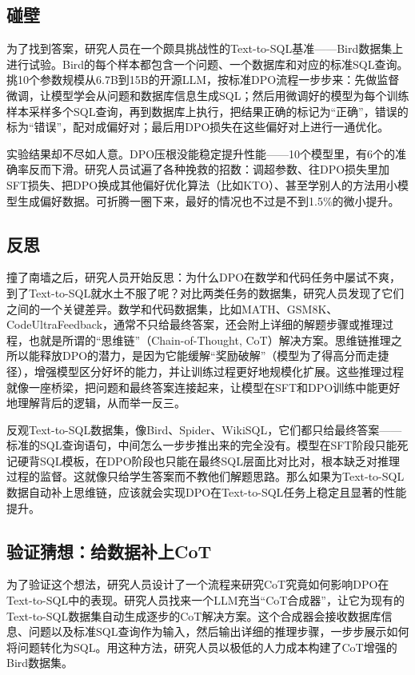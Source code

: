 \subsection{碰壁}

为了找到答案，研究人员在一个颇具挑战性的Text-to-SQL基准——Bird数据集上进行试验。Bird的每个样本都包含一个问题、一个数据库和对应的标准SQL查询。挑10个参数规模从6.7B到15B的开源LLM，按标准DPO流程一步步来：先做监督微调，让模型学会从问题和数据库信息生成SQL；然后用微调好的模型为每个训练样本采样多个SQL查询，再到数据库上执行，把结果正确的标记为“正确”，错误的标为“错误”，配对成偏好对；最后用DPO损失在这些偏好对上进行一通优化。

实验结果却不尽如人意。DPO压根没能稳定提升性能——10个模型里，有6个的准确率反而下滑。研究人员试遍了各种挽救的招数：调超参数、往DPO损失里加SFT损失、把DPO换成其他偏好优化算法（比如KTO）、甚至学别人的方法用小模型生成偏好数据。可折腾一圈下来，最好的情况也不过是不到1.5\%的微小提升。

\subsection{反思}
撞了南墙之后，研究人员开始反思：为什么DPO在数学和代码任务中屡试不爽，到了Text-to-SQL就水土不服了呢？对比两类任务的数据集，研究人员发现了它们之间的一个关键差异。数学和代码数据集，比如MATH、GSM8K、CodeUltraFeedback，通常不只给最终答案，还会附上详细的解题步骤或推理过程，也就是所谓的“思维链”（Chain-of-Thought, CoT）解决方案。思维链推理之所以能释放DPO的潜力，是因为它能缓解“奖励破解”（模型为了得高分而走捷径），增强模型区分好坏的能力，并让训练过程更好地规模化扩展。这些推理过程就像一座桥梁，把问题和最终答案连接起来，让模型在SFT和DPO训练中能更好地理解背后的逻辑，从而举一反三。

反观Text-to-SQL数据集，像Bird、Spider、WikiSQL，它们都只给最终答案——标准的SQL查询语句，中间怎么一步步推出来的完全没有。模型在SFT阶段只能死记硬背SQL模板，在DPO阶段也只能在最终SQL层面比对比对，根本缺乏对推理过程的监督。这就像只给学生答案而不教他们解题思路。那么如果为Text-to-SQL数据自动补上思维链，应该就会实现DPO在Text-to-SQL任务上稳定且显著的性能提升。

\subsection{验证猜想：给数据补上CoT}
为了验证这个想法，研究人员设计了一个流程来研究CoT究竟如何影响DPO在Text-to-SQL中的表现。研究人员找来一个LLM充当“CoT合成器”，让它为现有的Text-to-SQL数据集自动生成逐步的CoT解决方案。这个合成器会接收数据库信息、问题以及标准SQL查询作为输入，然后输出详细的推理步骤，一步步展示如何将问题转化为SQL。用这种方法，研究人员以极低的人力成本构建了CoT增强的Bird数据集。


